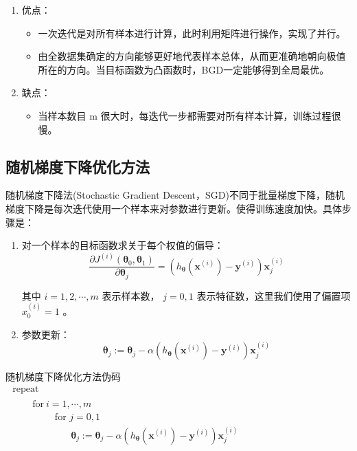\documentclass[UTF-8]{progbookcn}
\begin{document}
\begin{enumerate}
  \item 优点：
\begin{itemize}
  \item 一次迭代是对所有样本进行计算，此时利用矩阵进行操作，实现了并行。
  \item 由全数据集确定的方向能够更好地代表样本总体，从而更准确地朝向极值所在的方向。当目标函数为凸函数时，BGD一定能够得到全局最优。
\end{itemize}
  \item 缺点：
\begin{itemize}
  \item 当样本数目 m 很大时，每迭代一步都需要对所有样本计算，训练过程很慢。
\end{itemize}
\end{enumerate}





\subsection{随机梯度下降优化方法}
随机梯度下降法(Stochastic Gradient Descent，SGD)不同于批量梯度下降，随机梯度下降是每次迭代使用一个样本来对参数进行更新\cite{DBLP:journals/ijon/Amari93}。使得训练速度加快。具体步骤是：

\begin{enumerate}
  \item 对一个样本的目标函数求关于每个权值的偏导：
        $$\frac{\partial J^{(i)}\left(\bm{\theta}_{0}, \bm{\theta}_{1}\right)}{\partial \bm{\theta}_{j}}=\left(h_{\bm{\theta}}\left(\bm{x}^{(i)}\right)-\bm{y}^{(i)}\right) \bm{x}_{j}^{(i)}$$

        其中 $i=1,2,\cdots,m$ 表示样本数， $j=0,1$ 表示特征数，这里我们使用了偏置项 $x_0^{(i)}=1$ 。
  \item 参数更新：
$$\bm{\theta}_{j}:=\bm{\theta}_{j}-\alpha\left(h_{\bm{\theta}}\left(\bm{x}^{(i)}\right)-\bm{y}^{(i)}\right) \bm{x}_{j}^{(i)}$$
\end{enumerate}

\begin{titledbox}{随机梯度下降优化方法伪码}
$\begin{array}{l}{\text { repeat}}\\{\qquad\begin{array}{l}{\text{for}~i=1,\cdots,m}\\ {\qquad\text { for }j=0,1} \\{\qquad\qquad\bm{\theta}_{j}:=\bm{\theta}_{j}-\alpha \left(h_{\bm{\theta}}\left(\bm{x}^{(i)}\right)-\bm{y}^{(i)}\right) \bm{x}_{j}^{(i)}}\end{array}}\end{array}$
\end{titledbox}
\end{document}
